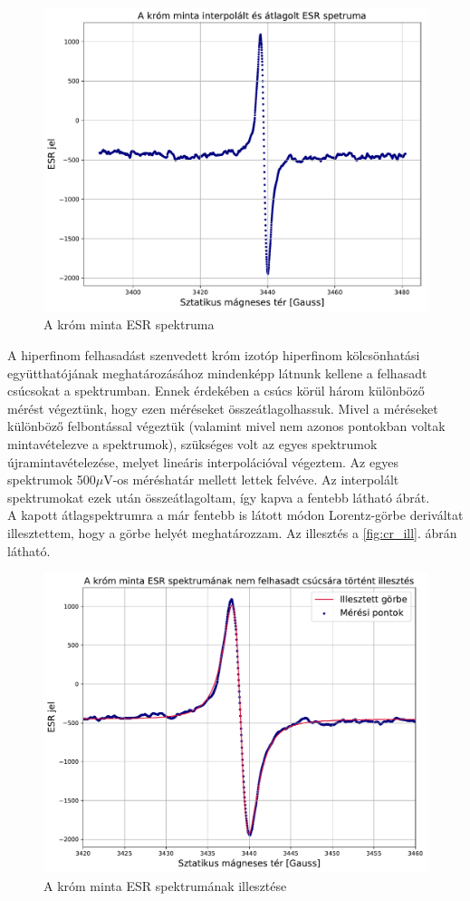 \documentclass[12pt,a4paper]{article}
\begin{document}
\begin{figure}[!h]
\centering
\includegraphics[scale=0.6]{crom_avg_spec}
\caption{A króm minta ESR spektruma}
\label{fig:cr}
\end{figure}
\newline
A hiperfinom felhasadást szenvedett króm izotóp hiperfinom kölcsönhatási együtthatójának meghatározásához mindenképp látnunk kellene a felhasadt csúcsokat a spektrumban. Ennek érdekében a csúcs körül három különböző mérést végeztünk, hogy ezen méréseket összeátlagolhassuk. Mivel a méréseket különböző felbontással végeztük (valamint mivel nem azonos pontokban voltak mintavételezve a spektrumok), szükséges volt az egyes spektrumok újramintavételezése, melyet lineáris interpolációval végeztem. Az egyes spektrumok 500$\mu$V-os méréshatár mellett lettek felvéve. Az interpolált spektrumokat ezek után összeátlagoltam, így kapva a fentebb látható ábrát.\\
\newpage
\hspace*{10pt} A kapott átlagspektrumra a már fentebb is látott módon Lorentz-görbe deriváltat illesztettem, hogy a görbe helyét meghatározzam. Az illesztés a \ref{fig:cr_ill}. ábrán látható.
\begin{figure}[!h]
\centering
\includegraphics[scale=0.6]{cr_peak_fit}
\caption{A króm minta ESR spektrumának illesztése}
\label{fig:cr}
\end{figure}
\end{document}
